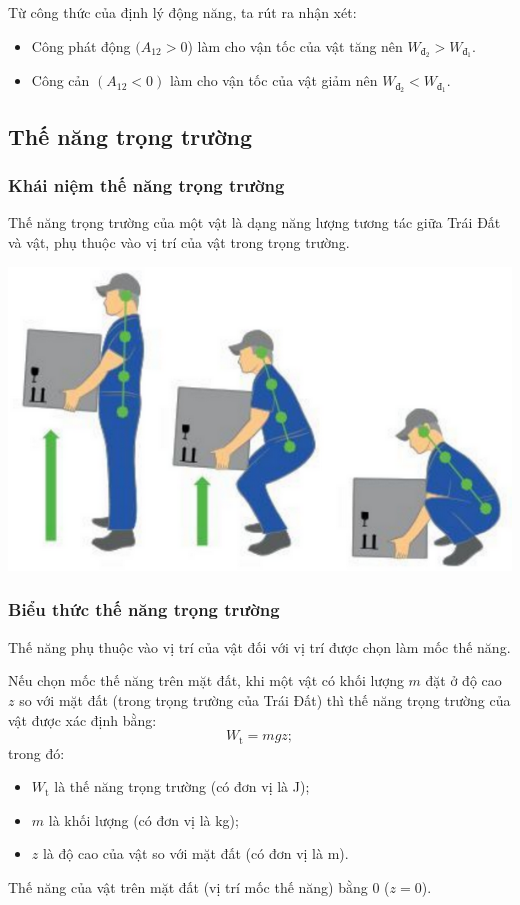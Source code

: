 \noindent Từ công thức của định lý động năng, ta rút ra nhận xét:
\begin{itemize}
	\item Công phát động $(A_{12}>0$) làm cho vận tốc của vật tăng nên $W_{\text{đ}_2} > W_{\text{đ}_1}$.
	\item Công cản $(A_{12}<0)$ làm cho vận tốc của vật giảm nên $W_{\text{đ}_2} < W_{\text{đ}_1}$.
\end{itemize}
\subsection{Thế năng trọng trường}
\subsubsection{Khái niệm thế năng trọng trường}

Thế năng trọng trường của một vật là dạng năng lượng tương tác giữa Trái Đất và vật, phụ thuộc vào vị trí của vật trong trọng trường.	
\begin{center}
	\includegraphics[scale=0.4]{../figs/G10-020-1}
\end{center}
\subsubsection{Biểu thức thế năng trọng trường}

Thế năng phụ thuộc vào vị trí của vật đối với vị trí được chọn làm mốc thế năng. 

Nếu chọn mốc thế năng trên mặt đất, khi một vật có khối lượng $m$ đặt ở độ cao $z$ so với mặt đất (trong trọng trường của Trái Đất) thì thế năng trọng trường của vật được xác định bằng:
\begin{equation*}
	W_\text{t}=mgz;
\end{equation*}
trong đó:
\begin{itemize}
	\item $W_\text{t}$ là thế năng trọng trường (có đơn vị là J);
	\item $m$ là khối lượng (có đơn vị là kg);
	\item $z$ là độ cao của vật so với mặt đất (có đơn vị là m).
\end{itemize}
Thế năng của vật trên mặt đất (vị trí mốc thế năng) bằng 0 ($z=0$). 

